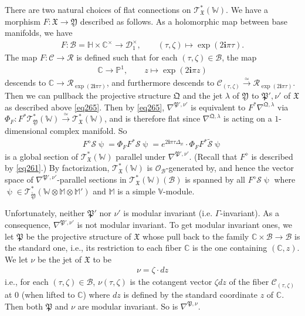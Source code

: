 \documentclass[12pt,b5paper,notitlepage]{report}
\theoremstyle{definition}
\theoremstyle{plain}
\newcommand{\fk}{\mathfrak}
\newcommand{\mc}{\mathcal}
\newcommand{\wtd}{\widetilde}
\newcommand{\scr}{\mathscr}
\newcommand{\im}{\mathbf{i}}
\newcommand{\mbb}{\mathbb}
\newcommand{\Vbb}{\mathbb V}
\newcommand{\Wbb}{\mathbb W}
\newcommand{\Mbb}{\mathbb M}
\newcommand{\Cbb}{\mathbb C}
\newcommand{\Pbb}{\mathbb P}
\numberwithin{equation}{section}
\begin{document}
There are two natural choices of flat connections on $\scr T_{\fk X}^*(\Wbb)$. We have a morphism $F:\fk X\rightarrow\fk Y$ described as follows. As a holomorphic map between base manifolds, we have
\begin{gather*}
F:\mc B=\mbb H\times\Cbb^\times\rightarrow \mc D_1^\times,\qquad (\tau,\zeta)\mapsto \exp(2\im\pi\tau).
\end{gather*}
The map $F:\mc C\rightarrow\mc R$ is defined such that  for each $(\tau,\zeta)\in\mc B$, the map 
\begin{align*}
\Cbb\rightarrow\Pbb^1,\qquad z\mapsto \exp(2\im\pi z)
\end{align*}
descends to $\Cbb\rightarrow \mc R_{\exp(2\im\pi\tau)}$, and furthermore descends to $\mc C_{(\tau,\zeta)}\xrightarrow{\simeq}\mc R_{\exp(2\im\pi\tau)}$. Then we can pullback the projective structure $\fk Q$ and the jet $\lambda$ of $\fk Y$ to $\fk P',\nu'$ of $\fk X$ as described above \eqref{eq265}. Then by \eqref{eq265}, $\nabla^{\fk P',\nu'}$ is equivalent to $F^*\nabla^{\fk Q,\lambda}$ via $\Phi_F:F^*\scr T_{\fk Y}^*(\Wbb)\xrightarrow{\simeq}\scr T_{\fk X}^*(\Wbb)$, and is therefore flat since $\nabla^{\fk Q,\lambda}$ is acting on a $1$-dimensional complex manifold. So 
\begin{align*}
F^\diamond\mc S\uppsi=\Phi_F F^*\mc S\uppsi=e^{2\im\pi\tau\Delta_\Mbb}\cdot \Phi_F F^*\wtd{\mc S}\uppsi
\end{align*}
is a global section of $\scr T_{\fk X}^*(\Wbb)$ parallel under $\nabla^{\fk P',\nu'}$. (Recall that $F^\diamond$ is described by \eqref{eq261}.) By factorization, $\scr T_{\fk X}^*(\Wbb)$ is $\scr O_{\mc B}$-generated by, and hence the  vector space of $\nabla^{\fk P',\nu'}$-parallel sections in $\scr T_{\fk X}^*(\Wbb)(\mc B)$ is spanned by all $F^\diamond\mc S\uppsi$ where $\uppsi\in\scr T_{\wtd{\fk Y}}^*(\Wbb\otimes\Mbb\otimes\Mbb')$ and $\Mbb$ is a simple $\Vbb$-module.



Unfortunately, neither $\fk P'$ nor $\nu'$ is modular invariant (i.e. $\Gamma$-invariant). As a consequence, $\nabla^{\fk P',\nu'}$ is not modular invariant. To get modular invariant ones, we let $\fk P$ be the projective structure of $\fk X$ whose pull back to the family $\Cbb\times\mc B\rightarrow\mc B$ is the standard one, i.e., its restriction to each fiber $\Cbb$ is the one containing $(\Cbb,z)$. We let $\nu$ be the jet of $\fk X$ to be 
\begin{align*}
\nu=\zeta\cdot dz
\end{align*}
i.e., for each $(\tau,\zeta)\in\mc B$, $\nu(\tau,\zeta)$ is the cotangent vector $\zeta dz$ of the fiber $\mc C_{(\tau,\zeta)}$ at $0$ (when lifted to $\Cbb$) where $dz$ is defined by the standard coordinate $z$ of $\Cbb$. Then both $\fk P$ and $\nu$ are modular invariant. So is $\nabla^{\fk P,\nu}$.
\end{document}
